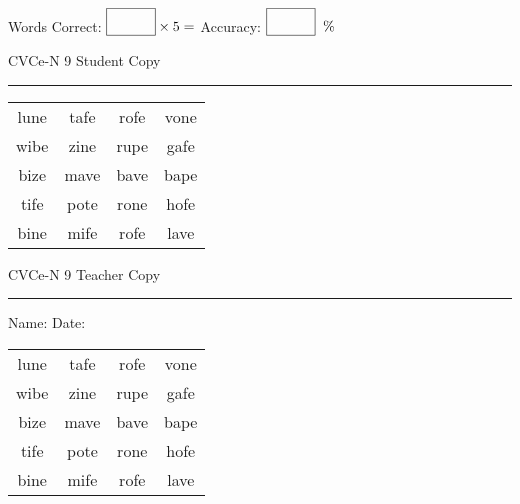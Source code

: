 \documentclass{memoir}
\begin{document}
\small

Words Correct: $\fbox{\phantom{\huge 100}} \times 5 = $ Accuracy: $\fbox{\phantom{\huge 100}}\;\; \%$ 

\vfill

\newpage


\footnotesize \noindent
CVCe-N 9 \hfill Student Copy
\smallskip
\hrule

\Large

\setlength{\tabcolsep}{14pt}
\def\arraystretch{2}

{\selectfont


\begin{vplace}[0.5]
\begin{center}
\begin{tabular}{cccc}
lune & tafe & rofe & vone \\
wibe & zine & rupe & gafe \\
bize & mave & bave & bape \\
tife & pote & rone & hofe \\
bine & mife & rofe & lave \\
\end{tabular}
\end{center}
\end{vplace}

}

\newpage

\footnotesize \noindent
CVCe-N 9 \hfill Teacher Copy
\smallskip
\hrule

\small

\vfill

\noindent
Name: \underline{\hspace{1.75in}} \hfill Date: \underline{\hspace{1in}}

\Large

{\selectfont


\begin{vplace}[0.5]
\begin{center}
\begin{tabular}{cccc}
lune & tafe & rofe & vone \\
wibe & zine & rupe & gafe \\
bize & mave & bave & bape \\
tife & pote & rone & hofe \\
bine & mife & rofe & lave \\
\end{tabular}
\end{center}
\end{vplace}



}
\end{document}
